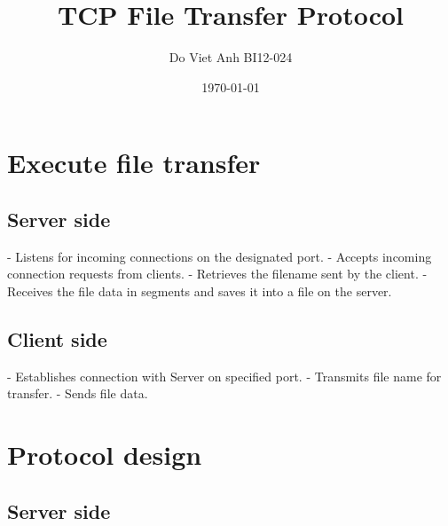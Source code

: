\documentclass{article}
\title{TCP File Transfer Protocol}
\author{Do Viet Anh BI12-024}
\date{\today}
\begin{document}
\maketitle

\date{}

\section{Execute file transfer}

\subsection{Server side}
- Listens for incoming connections on the designated port.\newline 
- Accepts incoming connection requests from clients.\newline 
- Retrieves the filename sent by the client.\newline 
- Receives the file data in segments and saves it into a file on the server.\newline  

\subsection{Client side}
- Establishes connection with Server on specified port.\newline 
- Transmits file name for transfer.\newline 
- Sends file data.\newline 

\section{Protocol design}

\subsection{Server side}
\end{document}

